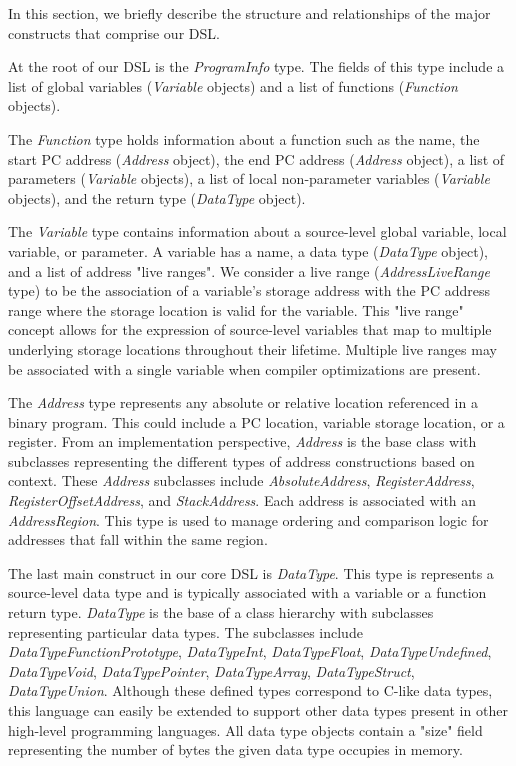 In this section, we briefly describe the structure and relationships of the major constructs that comprise our DSL.

At the root of our DSL is the \emph{ProgramInfo} type. The fields of this type include a list of global variables (\emph{Variable} objects) and a list of functions (\emph{Function} objects).

The \emph{Function} type holds information about a function such as the name, the start PC address (\emph{Address} object), the end PC address (\emph{Address} object), a list of parameters (\emph{Variable} objects), a list of local non-parameter variables (\emph{Variable} objects), and the return type (\emph{DataType} object).

The \emph{Variable} type contains information about a source-level global variable, local variable, or parameter. A variable has a name, a data type (\emph{DataType} object), and a list of address "live ranges". We consider a live range (\emph{AddressLiveRange} type) to be the association of a variable's storage address with the PC address range where the storage location is valid for the variable. This "live range" concept allows for the expression of source-level variables that map to multiple underlying storage locations throughout their lifetime. Multiple live ranges may be associated with a single variable when compiler optimizations are present.

The \emph{Address} type represents any absolute or relative location referenced in a binary program. This could include a PC location, variable storage location, or a register. From an implementation perspective, \emph{Address} is the base class with subclasses representing the different types of address constructions based on context. These \emph{Address} subclasses include \emph{AbsoluteAddress}, \emph{RegisterAddress}, \emph{RegisterOffsetAddress}, and \emph{StackAddress}. Each address is associated with an \emph{AddressRegion}. This type is used to manage ordering and comparison logic for addresses that fall within the same region.

The last main construct in our core DSL is \emph{DataType}. This type is represents a source-level data type and is typically associated with a variable or a function return type. \emph{DataType} is the base of a class hierarchy with subclasses representing particular data types. The subclasses include \emph{DataTypeFunctionPrototype}, \emph{DataTypeInt}, \emph{DataTypeFloat}, \emph{DataTypeUndefined}, \emph{DataTypeVoid}, \emph{DataTypePointer}, \emph{DataTypeArray}, \emph{DataTypeStruct}, \emph{DataTypeUnion}. Although these defined types correspond to C-like data types, this language can easily be extended to support other data types present in other high-level programming languages. All data type objects contain a "size" field representing the number of bytes the given data type occupies in memory.

